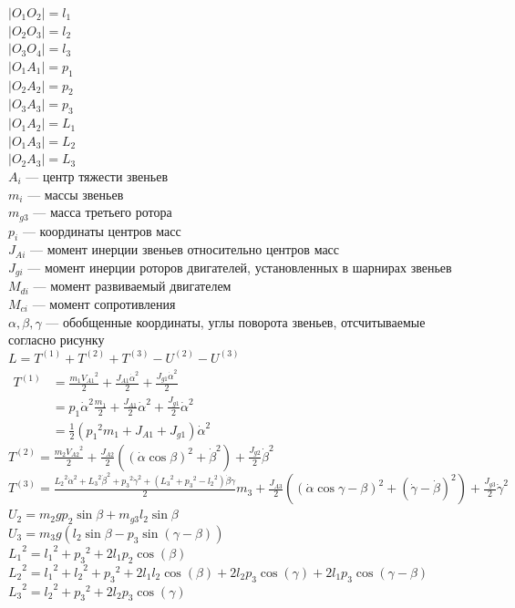 \documentclass{article}
\begin{document}
$|O_1O_2|=l_1$\\
$|O_2O_3|=l_2$\\
$|O_3O_4|=l_3$\\
$|O_1A_1|=p_1$\\
$|O_2A_2|=p_2$\\
$|O_3A_3|=p_3$\\
$|O_1A_2|=L_1$\\
$|O_1A_3|=L_2$\\
$|O_2A_3|=L_3$\\
$A_i$ --- центр тяжести звеньев\\
$m_i$ --- массы звеньев\\
$m_{g3}$ --- масса третьего ротора\\
$p_i$ --- координаты центров масс\\
$J_{Ai}$ --- момент инерции звеньев относительно центров масс\\
$J_{gi}$ --- момент инерции роторов двигателей, установленных в шарнирах звеньев\\
$M_{di}$ --- момент развиваемый двигателем\\
$M_{ci}$ --- момент сопротивления\\
$\alpha,\beta,\gamma$ --- обобщенные координаты, углы поворота звеньев, отсчитываемые согласно рисунку\\
$L = T^{(1)} + T^{(2)} + T^{(3)} - U^{(2)} - U^{(3)}$\\
$\begin{aligned}T^{(1)} &= {\frac{m_1 {V_{A1}}^2}{2}} +\frac{J_{A1}{\dot\alpha}^2}{2} + \frac{J_{g1} {\dot\alpha}^2}{2} \\&= {p_1 \dot\alpha}^2 \frac{m_1}{2} +\frac{J_{A1}}{2}{\dot\alpha}^2 +\frac{J_{g1}}{2} {\dot\alpha}^2 \\&= \frac{1}{2} ({p_1}^2 m_1 + J_{A1}+ J_{g1}){\dot\alpha}^2\end{aligned}$\\
$T^{(2)} = \frac{m_2 {V_{A2}}^2}{2} + \frac{J_{A2}}{2}({(\dot\alpha \cos\beta)}^2+{\dot\beta}^2) + \frac{J_{g2}}{2}{\dot\beta}^2$\\
$T^{(3)} = \frac{{L_2}^2 {\dot\alpha}^2 + {L_3}^2 {\dot\beta}^2 + {p_3}^2 {\dot\gamma}^2+ ({L_3}^2+{p_3}^2-{l_2}^2)\dot\beta\dot\gamma}{2}m_3 + \frac{J_{A3}}{2}({(\dot\alpha \cos{\gamma - \beta})}^2 + {(\dot\gamma -\dot\beta)}^2) +\frac{J_{g3}}{2}{\dot\gamma}^2$\\
$U_2 = m_2gp_2\sin\beta + m_{g3}l_2\sin\beta$\\
$U_3=m_3g(l_2\sin\beta - p_3\sin{(\gamma-\beta)})$\\
${L_1}^2={l_1}^2+{p_3}^2+2l_1p_2\cos(\beta)$\\
${L_2}^2={l_1}^2+{l_2}^2+{p_3}^2+2l_1l_2\cos(\beta)+2l_2p_3\cos(\gamma)+2l_1p_3\cos(\gamma-\beta)$\\
${L_3}^2={l_2}^2+{p_3}^2+2l_2p_3\cos(\gamma)$
\end{document}
